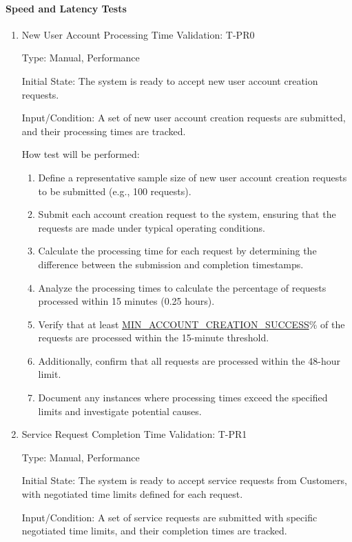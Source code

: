 \documentclass[12pt, titlepage]{article}
\begin{document}
\paragraph{Speed and Latency Tests}
\begin{enumerate}

\item{New User Account Processing Time Validation: T-PR0\\}

Type: Manual, Performance

Initial State: The system is ready to accept new user account creation requests.

Input/Condition: A set of new user account creation requests are submitted, and their processing times are tracked.

How test will be performed:
\begin{enumerate}
    \item Define a representative sample size of new user account creation requests to be submitted (e.g., 100 requests).
    \item Submit each account creation request to the system, ensuring that the requests are made under typical operating conditions.
    \item Calculate the processing time for each request by determining the difference between the submission and completion timestamps.
    \item Analyze the processing times to calculate the percentage of requests processed within 15 minutes (0.25 hours).
    \item Verify that at least \hyperref[MIN_ACCOUNT_CREATION_SUCCESS]{MIN\_ACCOUNT\_CREATION\_SUCCESS}\% of the requests are processed within the 15-minute threshold.
    \item Additionally, confirm that all requests are processed within the 48-hour limit.
    \item Document any instances where processing times exceed the specified limits and investigate potential causes.
\end{enumerate}

\item{Service Request Completion Time Validation: T-PR1\\}

Type: Manual, Performance

Initial State: The system is ready to accept service requests from Customers, with negotiated time limits defined for each request.

Input/Condition: A set of service requests are submitted with specific negotiated time limits, and their completion times are tracked.


\end{enumerate}
\end{document}
